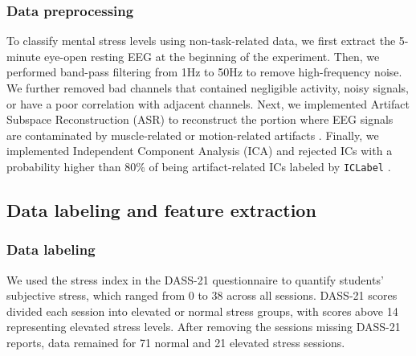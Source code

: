 \documentclass[journal]{IEEEtran}
\newcommand{\mc}[1]{\textcolor{red}{#1}}
\begin{document}
\subsubsection{Data preprocessing}
To classify mental stress levels using non-task-related data, we first extract the 5-minute eye-open resting EEG at the beginning of the experiment.
Then, we performed band-pass filtering from 1Hz to 50Hz to remove high-frequency noise.
We further removed bad channels that contained negligible activity, noisy signals, or have a poor correlation with adjacent channels.
Next, we implemented Artifact Subspace Reconstruction (ASR) to reconstruct the portion where EEG signals are contaminated by muscle-related or motion-related artifacts \cite{Kothe2014, chang2019evaluation}.
Finally, we implemented Independent Component Analysis (ICA) and rejected ICs with a probability higher than 80\% of being artifact-related ICs labeled by \texttt{ICLabel} \cite{pion2019_iclabel}.

\subsection{Data labeling and feature extraction}
\subsubsection{Data labeling}
We used the stress index in the DASS-21 questionnaire to quantify students' subjective stress, which ranged from 0 to 38 across all sessions. 
DASS-21 scores divided each session into elevated or normal stress groups, with scores above 14 representing elevated stress levels.
After removing the sessions missing DASS-21 reports, data remained for 71 normal and 21 elevated stress sessions.


\end{document}
